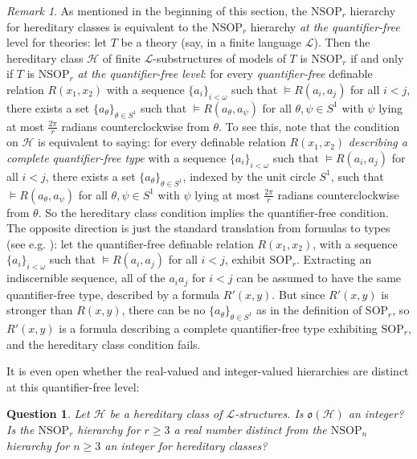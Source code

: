 \documentclass{amsart}
\newtheorem{question}[theorem]{Question}
\theoremstyle{definition}
\theoremstyle{remark}
\newtheorem{remark}[theorem]{Remark}
\numberwithin{equation}{section}
\begin{document}
\begin{remark}\label{hereditary classes and quantifier-free formulas}
    As mentioned in the beginning of this section, the $\mathrm{NSOP}_{r}$ hierarchy for hereditary classes is equivalent to the $\mathrm{NSOP}_{r}$ hierarchy \textit{at the quantifier-free} level for theories: let $T$ be a theory (say, in a finite language $\mathcal{L}$). Then the hereditary class $\mathcal{H}$ of finite $\mathcal{L}$-substructures of models of $T$ is $\mathrm{NSOP}_{r}$ if and only if $T$ is $\mathrm{NSOP}_{r}$ \textit{at the quantifier-free level}: for every \textit{quantifier-free} definable relation $R(x_{1}, x_{2})$ with a sequence $\{a_{i}\}_{i < \omega}$ such that $\models R(a_{i}, a_{j})$ for all $i < j$, there exists a set $\{a_{\theta}\}_{\theta \in S^{1}}$ such that $\models R(a_{\theta}, a_{\psi})$ for all $\theta, \psi \in S^{1}$ with $\psi$ lying at most $\frac{2\pi}{r}$ radians counterclockwise from $\theta$. To see this, note that the condition on $\mathcal{H}$ is equivalent to saying: for every definable relation $R(x_{1}, x_{2})$ \textit{describing a complete quantifier-free type} with a sequence $\{a_{i}\}_{i < \omega}$ such that $\models R(a_{i}, a_{j})$ for all $i < j$, there exists a set $\{a_{\theta}\}_{\theta \in S^{1}}$, indexed by the unit circle $S^{1}$, such that $\models R(a_{\theta}, a_{\psi})$ for all $\theta, \psi \in S^{1}$ with $\psi$ lying at most $\frac{2\pi}{r}$ radians counterclockwise from $\theta$. So the hereditary class condition implies the quantifier-free condition. The opposite direction is just the standard translation from formulas to types (see e.g. \cite{She95}): let the quantifier-free definable relation $R(x_{1}, x_{2})$, with a sequence $\{a_{i}\}_{i < \omega}$ such that $\models R(a_{i}, a_{j})$ for all $i < j$, exhibit $\mathrm{SOP}_{r}$. Extracting an indiscernible sequence, all of the $a_{i}a_{j}$ for $i < j$ can be assumed to have the same quantifier-free type, described by a formula $R'(x, y)$. But since $R'(x, y)$ is stronger than $R(x, y)$, there can be no $\{a_{\theta}\}_{\theta \in S^{1}}$ as in the definition of $\mathrm{SOP}_{r}$, so $R'(x, y)$ is a formula describing a complete quantifier-free type exhibiting $\mathrm{SOP}_{r}$, and the hereditary class condition fails.
\end{remark}

It is even open whether the real-valued and integer-valued hierarchies are distinct at this quantifier-free level:

\begin{question}\label{hereditary class distinctness}
    Let $\mathcal{H}$ be a hereditary class of $\mathcal{L}$-structures. Is $\mathfrak{o}(\mathcal{H})$ an integer? Is the $\mathrm{NSOP}_{r}$ hierarchy for $r \geq 3$ a real number distinct from the $\mathrm{NSOP}_{n}$ hierarchy for $n \geq 3$ an integer \emph{for hereditary classes}?
\end{question}
\end{document}

